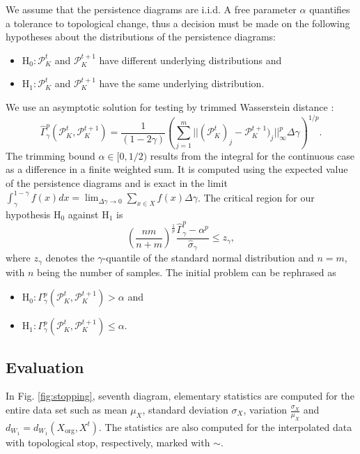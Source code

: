 \documentclass[runningheads]{llncs}
\begin{document}
We assume that the persistence diagrams are i.i.d. A free parameter $\alpha$ quantifies a tolerance to topological change, thus a decision must be made on the following hypotheses about the distributions of the persistence diagrams:
\begin{center}
  \begin{itemize}
    \item[(a)] $\text{H}_0: \mathcal{P}_K^t$ and $\mathcal{P}_K^{t+1}$ have different underlying distributions and
    \item[(b)] $\text{H}_1: \mathcal{P}_K^t$ and $\mathcal{P}_K^{t+1}$ have the same underlying distribution.
  \end{itemize}
\end{center}
We use an asymptotic solution for testing by trimmed Wasserstein distance \cite{czado1998assessing}:
\begin{equation}
\hat{\Gamma}^p_\gamma(\mathcal{P}^t_K,\mathcal{P}^{t+1}_K) = \frac{1}{(1-2\gamma)} \left( \sum_{j=1}^{m} ||(\mathcal{P}^t_K)_j-\mathcal{P}^{t+1}_K)_j||^p_\infty \Delta \gamma \right)^{1/p}.
\end{equation}
The trimming bound $\alpha \in [0, 1/2)$ results from the integral for the continuous case as a difference in a finite weighted sum. It is computed using the expected value of the persistence diagrams and is exact in the limit $\int_\gamma^{1-\gamma} f(x) dx = \lim_{\Delta\gamma \rightarrow 0} \sum_{x \in X} f(x) \Delta \gamma$. The critical region for our hypothesis $\text{H}_0$ against $\text{H}_1$ is
\begin{equation}
\left(\frac{nm}{n+m}\right)^{\frac{1}{p}} \frac{\hat{\Gamma}^p_\gamma - \alpha^p}{\hat{\sigma}_\gamma} \leq z_\gamma,
\end{equation}
where $z_\gamma$ denotes the $\gamma$-quantile of the standard normal distribution and $n=m$, with $n$ being the number of samples. The initial problem can be rephrased as
\begin{center}
  \begin{itemize}
    \item[(a)] $\text{H}_0: \Gamma_\gamma^p (\mathcal{P}^t_K,\mathcal{P}^{t+1}_K) > \alpha$ and
    \item[(b)] $\text{H}_1: \Gamma_\gamma^p (\mathcal{P}^t_K,\mathcal{P}^{t+1}_K) \leq \alpha$.
  \end{itemize}
\end{center}

\subsection{Evaluation}
In Fig. \ref{fig:stopping}, seventh diagram, elementary statistics are computed for the entire data set such as mean $\mu_X$, standard deviation $\sigma_X$, variation $\frac{\sigma_X}{\mu_X}$ and $d_{W_1} = d_{W_1}(X_{\text{org}},X^{t})$. The statistics are also computed for the interpolated data with topological stop, respectively, marked with $\sim$.
\end{document}
